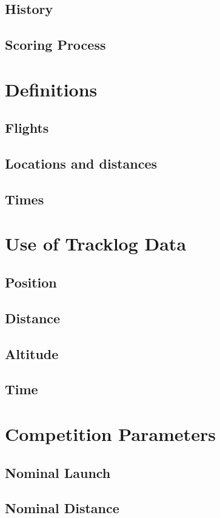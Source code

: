 \documentclass{article}
\begin{document}
\subsection{History}
\subsection{Scoring Process}

\newpage
\section{Definitions}
\subsection{Flights}
\subsection{Locations and distances}
\subsection{Times}

\newpage
\section{Use of Tracklog Data}
\subsection{Position}
\subsection{Distance}
\subsection{Altitude}
\subsection{Time}

\newpage
\section{Competition Parameters}
\subsection{Nominal Launch}
\subsection{Nominal Distance}
\end{document}
